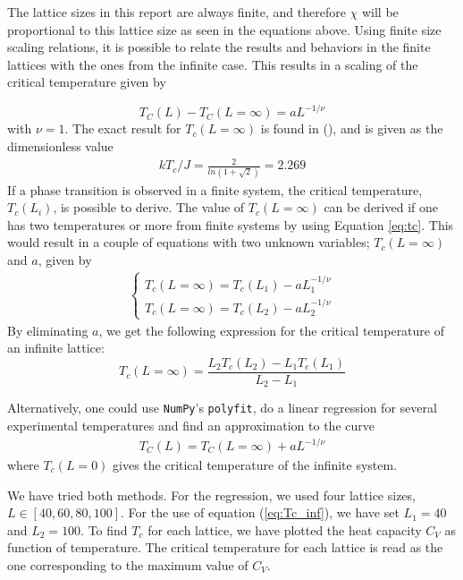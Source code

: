 \documentclass[12pt,english,a4paper]{article}
\begin{document}
\noindent The lattice sizes in this report are always finite, and therefore $\chi$ will be proportional to this lattice size as seen in the equations above. Using finite size scaling relations, it is possible to relate the results and behaviors in the finite lattices with the ones from the infinite case. This results in a scaling of the critical temperature given by

\begin{equation}
    T_C(L)-T_C(L=\infty) = aL^{-1/\nu} \label{eq:tc}
\end{equation}
with $\nu = 1$. The exact result for $T_c(L=\infty)$ is found in (\cite{LarsOns}), and is given as the dimensionless value
\begin{align*}
    kT_c/J=\frac{2}{ln(1+\sqrt{2})}=2.269
\end{align*}
If a phase transition is observed in a finite system, the critical temperature, $T_{c}(L_i)$, is possible to derive. The value of $T_{c}(L=\infty)$ can be derived if one has two temperatures or more from finite systems by using Equation \eqref{eq:tc}. This would result in a couple of equations with two unknown variables; $T_c(L=\infty)$ and $a$, given by
\begin{align*}
    \begin{cases}
        T_c(L=\infty)=T_c(L_1)-aL_1^{-1/\nu}\\
        T_c(L=\infty)=T_c(L_2)-aL_2^{-1/\nu}
    \end{cases}
\end{align*}
\noindent By eliminating $a$, we get the following expression for the critical temperature of an infinite lattice: 
\begin{equation}
    T_c(L=\infty) = \frac{L_2 T_c(L_2) - L_1 T_c(L_1)}{L_2-L_1}
    \label{eq:Tc_inf}
\end{equation}

Alternatively, one could use \texttt{NumPy}'s \texttt{polyfit}, do a linear regression for several experimental temperatures and find an approximation to the curve
\begin{align*}
        T_C(L) = T_C(L=\infty)+aL^{-1/\nu}
\end{align*}
where $T_c(L=0)$ gives the critical temperature of the infinite system. 

We have tried both methods. For the regression, we used four lattice sizes, $L \in [40,60,80,100]$. For the use of equation (\ref{eq:Tc_inf}), we have set $L_1 = 40$ and $L_2 = 100$. To find $T_c$ for each lattice, we have plotted the heat capacity $C_V$ as function of temperature. The critical temperature for each lattice is read as the one corresponding to the maximum value of $C_V$. 
\end{document}
